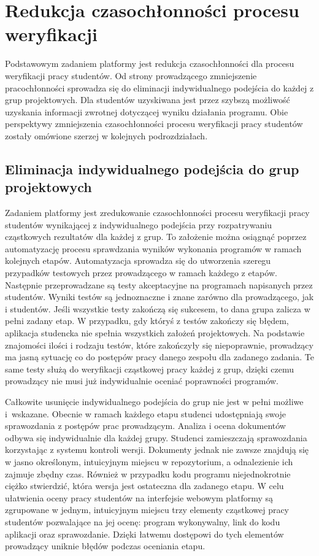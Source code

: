 \section{Redukcja czasochłonności procesu weryfikacji}

Podstawowym zadaniem platformy jest redukcja czasochłonności dla procesu weryfikacji pracy studentów.
Od strony prowadzącego zmniejszenie pracochłonności sprowadza się do eliminacji indywidualnego podejścia do każdej z grup projektowych.
Dla studentów uzyskiwana jest przez szybszą możliwość uzyskania informacji zwrotnej dotyczącej wyniku działania programu.
Obie perspektywy zmniejszenia czasochłonności procesu weryfikacji pracy studentów zostały omówione szerzej w kolejnych podrozdziałach.

\subsection{Eliminacja indywidualnego podejścia do grup projektowych}

Zadaniem platformy jest zredukowanie czasochłonności procesu weryfikacji pracy studentów wynikającej z indywidualnego podejścia przy rozpatrywaniu cząstkowych rezultatów dla każdej z grup.
To założenie można osiągnąć poprzez automatyzację procesu sprawdzania wyników wykonania programów w ramach kolejnych etapów.
Automatyzacja sprowadza się do utworzenia szeregu przypadków testowych przez prowadzącego w ramach każdego z etapów.
Następnie przeprowadzane są testy akceptacyjne na programach napisanych przez studentów.
Wyniki testów są jednoznaczne i znane zarówno dla prowadzącego, jak i studentów.
Jeśli wszystkie testy zakończą się sukcesem, to dana grupa zalicza w pełni zadany etap.
W przypadku, gdy któryś z testów zakończy się błędem, aplikacja studencka nie spełnia wszystkich założeń projektowych.
Na podstawie znajomości ilości i rodzaju testów, które zakończyły się niepoprawnie, prowadzący ma jasną sytuację co do postępów pracy danego zespołu dla zadanego zadania.
Te same testy służą do weryfikacji cząstkowej pracy każdej z grup, dzięki czemu prowadzący nie musi już indywidualnie oceniać poprawności programów.

Całkowite usunięcie indywidualnego podejścia do grup nie jest w pełni możliwe i~wskazane.
Obecnie w ramach każdego etapu studenci udostępniają swoje sprawozdania z postępów prac prowadzącym.
Analiza i ocena dokumentów odbywa się indywidualnie dla każdej grupy.
Studenci zamieszczają sprawozdania korzystając z systemu kontroli wersji.
Dokumenty jednak nie zawsze znajdują się w jasno określonym, intuicyjnym miejscu w repozytorium, a odnalezienie ich zajmuje zbędny czas.
Również w przypadku kodu programu niejednokrotnie ciężko stwierdzić, która wersja jest ostateczna dla zadanego etapu.
W celu ułatwienia oceny pracy studentów na interfejsie webowym platformy są zgrupowane w jednym, intuicyjnym miejscu trzy elementy cząstkowej pracy studentów pozwalające na jej ocenę: program wykonywalny, link do kodu aplikacji oraz sprawozdanie.
Dzięki łatwemu dostępowi do tych elementów prowadzący uniknie błędów podczas oceniania etapu.

